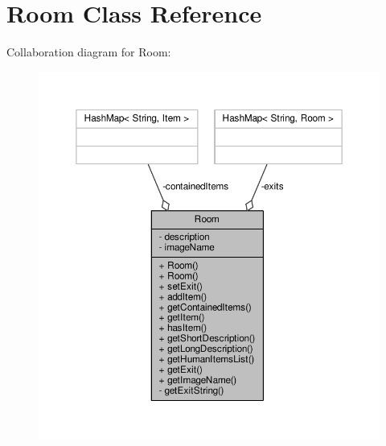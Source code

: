 \hypertarget{classRoom}{\section{Room Class Reference}
\label{classRoom}
}


Collaboration diagram for Room\-:
\nopagebreak
\begin{figure}[H]
\begin{center}
\leavevmode
\includegraphics[width=350pt]{classRoom__coll__graph}
\end{center}
\end{figure}
